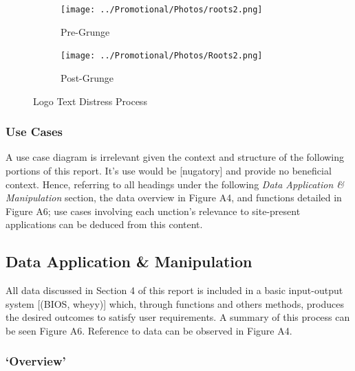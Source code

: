 \documentclass[11pt, english]{article}
\begin{document}
	\begin{figure}[H]
	\begin{center}
		\begin{subfigure}[t]{6cm}
                \begin{center}
                        \texttt{[image: ../Promotional/Photos/roots2.png]}
                \end{center}
                        \caption{Pre-Grunge}
                \end{subfigure}
                \begin{subfigure}[t]{6cm}
                \begin{center}
                        \texttt{[image: ../Promotional/Photos/Roots2.png]}
                \end{center}
                        \caption{Post-Grunge}
                \end{subfigure}
		\caption{Logo Text Distress Process}
	\end{center}
	\end{figure}

		\subsubsection{Use Cases}

	A use case diagram is irrelevant given the context and structure of the following portions of this report. It's use would be [nugatory] and provide no beneficial context. Hence, referring to all headings under the following \textit{Data Application \& Manipulation} section, the data overview in Figure A4, and functions detailed in Figure A6; use cases involving each unction's relevance to site-present applications can be deduced from this content.

	\subsection{Data Application \& Manipulation}

	All data discussed in Section 4 of this report is included in a basic input-output system [(BIOS, wheyy)] which, through functions and others methods, produces the desired outcomes to satisfy user requirements. A summary of this process can be seen Figure A6. Reference to data can be observed in Figure A4.

		\subsubsection{`Overview'}
\end{document}
